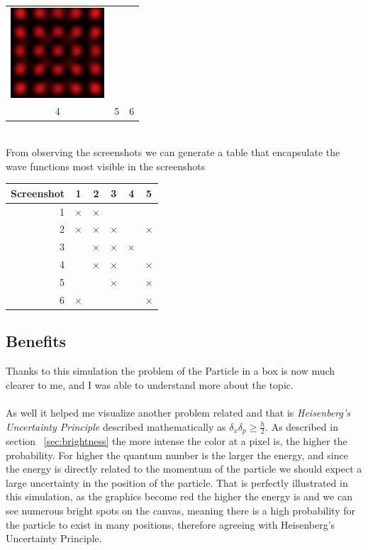 \documentclass[a4paper, 10pt]{article}
\begin{document}
\begin{table}[ht]
\begin{center}
\begin{tabular}{c c c}
            \includegraphics[width=3.5cm]{graphics/result5.png} \\
            4 & 5 & 6
        \end{tabular}
        \end{center}
    \end{table}\\
    From observing the screenshots we can generate a table that encapsulate the wave functions most visible
    in the screenshots
    \begin{table}[ht]
        \begin{center}
            \begin{tabular}{| r | c | c | c | c | c |}
            \hline
            Screenshot & 1 & 2 & 3 & 4 & 5 \\ \hline
            1 & $\times$ & $\times$ & & & \\ \hline
            2 & $\times$ & $\times$ & $\times$ & & $\times$ \\ \hline
            3 & & $\times$ & $\times$ & $\times$ & \\ \hline
            4 & & $\times$ & $\times$ & & $\times$ \\ \hline
            5 & & & $\times$ & & $\times$ \\ \hline
            6 & $\times$ & & & & $\times$ \\ \hline
            \end{tabular}
        \end{center}
    \end{table}

    \subsection{Benefits}
    Thanks to this simulation the problem of the Particle in a box is now much clearer
    to me, and I was able to understand more about the topic.\\\\
    As well it helped me visualize another problem related and that is \emph{Heisenberg's
    Uncertainty Principle} described mathematically as $\delta_x\delta_p \geq \frac{\hbar}{2}$.
    As described in section ~\ref{sec:brightness} the more intense the color at a pixel is,
    the higher the probability. For higher the quantum number is the larger the energy, and
    since the energy is directly related to the momentum of the particle we should expect
    a large uncertainty in the position of the particle. That is perfectly illustrated in this
    simulation, as the graphics become red the higher the energy is and we can see numerous
    bright spots on the canvas, meaning there is a high probability for the particle to exist
    in many positions, therefore agreeing with Heisenberg's Uncertainty Principle.
\end{document}
